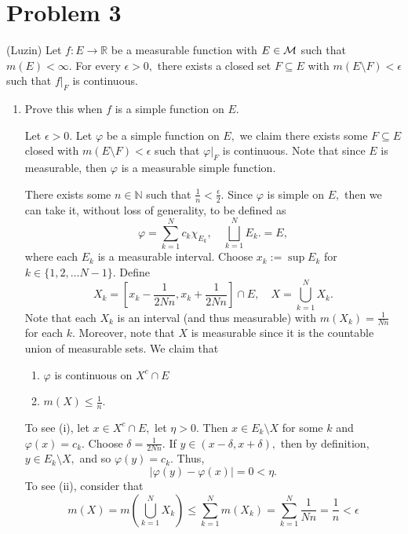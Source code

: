 \documentclass[11pt]{article}
\newcommand{\bbN}{\mathbb{N}}
\newcommand{\bbR}{\mathbb{R}}
\newcommand{\sm}{\setminus}
\begin{document}
\newpage
\section*{Problem 3}
\begin{problem}
    (Luzin) Let $f: E \to \bbR$ be a measurable function with $E \in \cal M$ such that $m(E) < \infty.$ For every $\epsilon>0,$ there exists a closed set $F\subseteq E$ with $m(E\sm F) < \epsilon$ such that $f|_F$ is continuous.
\end{problem}
\begin{enumerate}
    \item Prove this when $f$ is a simple function on $E.$
    \begin{solution}
        Let $\epsilon>0.$ Let $\varphi$ be a simple function on $E,$ we claim there exists some $F\subseteq E$ closed with $m(E\sm F) < \epsilon$ such that $\varphi|_F$ is continuous. Note that since $E$ is measurable, then $\varphi$ is a measurable simple function.
        
        There exists some $n \in \bbN$ such that $\frac{1}{n} < \frac{\epsilon}{2}.$ Since $\varphi$ is simple on $E,$ then we can take it, without loss of generality, to be defined as 
        \[\varphi = \sum_{k=1}^N c_k \chi_{E_k}, \quad \bigsqcup_{k=1}^N E_k. = E,\] where each $E_k$ is a measurable interval. Choose $x_k:=\sup E_k$ for $k \in \{1,2,\dots N-1\}.$  Define 
        \[X_k = [x_k - \frac{1}{2Nn}, x_k + \frac{1}{2N n}] \cap E, \quad X = \bigcup_{k=1}^N X_k.\] 
        Note that each $X_k$ is an interval (and thus measurable) with $m(X_k) = \frac{1}{Nn}$ for each $k.$ Moreover, note that $X$ is measurable since it is the countable union of measurable sets. We claim that 
        \begin{enumerate}
            \item $\varphi$ is continuous on $X^c \cap E$
            \item $m(X) \leq \frac{1}{n}.$
        \end{enumerate}
        To see (i), let $x\in X^c \cap E,$ let $\eta >0.$ Then $x \in E_k \sm X$ for some $k$ and $\varphi(x) = c_k.$ Choose $\delta = \frac{1}{2N n}.$ If $y\in (x - \delta, x + \delta),$ then by definition, $y \in E_k \sm X,$ and so $\varphi(y) = c_k.$ Thus, \[|\varphi(y) - \varphi(x)| = 0 < \eta.\] 
        To see (ii), consider that 
        \[m(X) = m\left(\bigcup_{k=1}^N X_k\right) \leq \sum_{k=1}^N m(X_k) = \sum_{k=1}^N \frac{1}{Nn} = \frac{1}{n}< \epsilon\]


\end{solution}
\end{enumerate}
\end{document}
